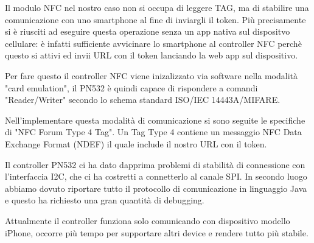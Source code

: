 Il modulo NFC nel nostro caso non si occupa di leggere TAG, ma di stabilire una comunicazione con uno smartphone al fine di inviargli il token.
Più precisamente si è riusciti ad eseguire questa operazione senza un app nativa sul dispositvo cellulare: 
è infatti sufficiente avvicinare lo smartphone al controller NFC perchè questo si attivi ed invii URL con il token lanciando la web app sul dispositivo.

Per fare questo il controller NFC viene inizalizzato via software nella modalità "card emulation", il PN532 è quindi capace di rispondere a comandi "Reader/Writer" 
secondo lo schema standard ISO/IEC 14443A/MIFARE.

Nell'implementare questa modalità di comunicazione si sono seguite le specifiche di "NFC Forum Type 4 Tag".
Un Tag Type 4 contiene un messaggio NFC Data Exchange Format (NDEF) il quale include il nostro URL con il token.

Il controller PN532 ci ha dato dapprima problemi di stabilità di connessione con l'interfaccia I2C, che ci ha costretti a connetterlo al canale SPI.
In secondo luogo abbiamo dovuto riportare tutto il protocollo di comunicazione in linguaggio Java e questo ha richiesto una gran quantità di debugging.

Attualmente il controller funziona solo comunicando con dispositivo modello iPhone, occorre più tempo per supportare altri device e rendere tutto più stabile. 

\newpage
